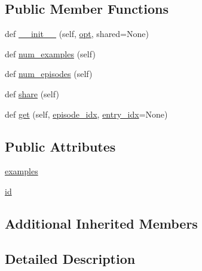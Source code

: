 \subsection*{Public Member Functions}
\begin{DoxyCompactItemize}
\item 
def \hyperlink{classparlai_1_1tasks_1_1qangaroo_1_1agents_1_1DefaultTeacher_aa46ac201bb6d53bc9333a97cbe4d3b41}{\+\_\+\+\_\+init\+\_\+\+\_\+} (self, \hyperlink{classparlai_1_1core_1_1agents_1_1Teacher_a3ce6243860ce978a897922863ed32fa4}{opt}, shared=None)
\item 
def \hyperlink{classparlai_1_1tasks_1_1qangaroo_1_1agents_1_1DefaultTeacher_a88e8755506c654d988f3071823941b91}{num\+\_\+examples} (self)
\item 
def \hyperlink{classparlai_1_1tasks_1_1qangaroo_1_1agents_1_1DefaultTeacher_a467ada61caf807815a88abfd6e742799}{num\+\_\+episodes} (self)
\item 
def \hyperlink{classparlai_1_1tasks_1_1qangaroo_1_1agents_1_1DefaultTeacher_a9563de73ddadc0d567516f5b1615a264}{share} (self)
\item 
def \hyperlink{classparlai_1_1tasks_1_1qangaroo_1_1agents_1_1DefaultTeacher_a02b79b33e67868bc575b65e26de38d51}{get} (self, \hyperlink{classparlai_1_1core_1_1teachers_1_1FixedDialogTeacher_afd4ebab8063eb42d182d30a1a41f133e}{episode\+\_\+idx}, \hyperlink{classparlai_1_1core_1_1teachers_1_1FixedDialogTeacher_ae3201b15f3c3b46a2f3511bad9b43e7d}{entry\+\_\+idx}=None)
\end{DoxyCompactItemize}
\subsection*{Public Attributes}
\begin{DoxyCompactItemize}
\item 
\hyperlink{classparlai_1_1tasks_1_1qangaroo_1_1agents_1_1DefaultTeacher_a3dcc14aaea5fa95b3d878c6c3a2e9e11}{examples}
\item 
\hyperlink{classparlai_1_1tasks_1_1qangaroo_1_1agents_1_1DefaultTeacher_a4d036962beeb5b5d446bf04327e49014}{id}
\end{DoxyCompactItemize}
\subsection*{Additional Inherited Members}


\subsection{Detailed Description}


